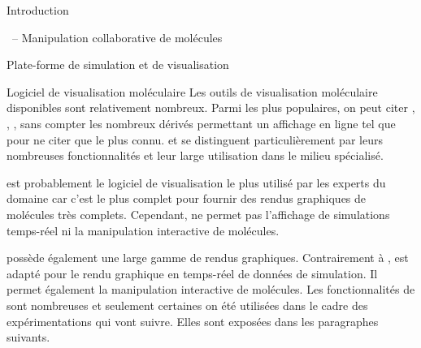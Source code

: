 \documentclass[myfrancais]{mythesis}
\begin{document}
\begin{mypart}{Introduction}
\begin{mychapter}{\myShaddock\ -- Manipulation collaborative de molécules}
\begin{mysection}{Plate-forme de simulation et de visualisation}
				\begin{mysubsection}{Logiciel de visualisation moléculaire}
					Les outils de visualisation moléculaire disponibles sont relativement nombreux.
					Parmi les plus populaires, on peut citer \myPyMOL {},  , \myChimera {}, \myRasmol {} sans compter les nombreux dérivés permettant un affichage en ligne tel que \myJmol {} pour ne citer que le plus connu.
					\myPyMOL et  se distinguent particulièrement par leurs nombreuses fonctionnalités et leur large utilisation dans le milieu spécialisé.

					\myPyMOL est probablement le logiciel de visualisation le plus utilisé par les experts du domaine car c'est le plus complet pour fournir des rendus graphiques de molécules très complets.
					Cependant, \myPyMOL ne permet pas l'affichage de simulations temps-réel ni la manipulation interactive de molécules.

					 possède également une large gamme de rendus graphiques.
					Contrairement à \myPyMOL,  est adapté pour le rendu graphique en temps-réel de données de simulation.
					Il permet également la manipulation interactive de molécules.
					Les fonctionnalités de  sont nombreuses et seulement certaines on été utilisées dans le cadre des expérimentations qui vont suivre.
					Elles sont exposées dans les paragraphes suivants.


\end{mysubsection}
\end{mysection}
\end{mychapter}
\end{mypart}
\end{document}
